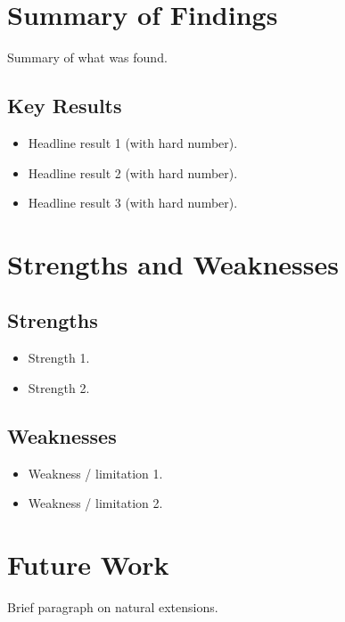 
\section{Summary of Findings}
Summary of what was found.

\subsection{Key Results}
\begin{itemize}
    \item Headline result 1 (with hard number).
    \item Headline result 2 (with hard number).
    \item Headline result 3 (with hard number).
\end{itemize}

\section{Strengths and Weaknesses}

\subsection{Strengths}
\begin{itemize}
    \item Strength 1.
    \item Strength 2.
\end{itemize}

\subsection{Weaknesses}
\begin{itemize}
    \item Weakness / limitation 1.
    \item Weakness / limitation 2.
\end{itemize}

\section{Future Work}
Brief paragraph on natural extensions.



